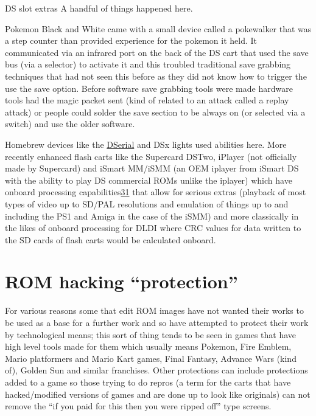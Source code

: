 \documentclass[
]{book}
\begin{document}
DS slot extras A handful of things happened here.

Pokemon Black and White came with a small device called a pokewalker that was a step counter than provided experience for the pokemon it held. It communicated via an infrared port on the back of the DS cart that used the save bus (via a selector) to activate it and this troubled traditional save grabbing techniques that had not seen this before as they did not know how to trigger the use the save option. Before software save grabbing tools were made hardware tools had the magic packet sent (kind of related to an attack called a replay attack) or people could solder the save section to be always on (or selected via a switch) and use the older software.

Homebrew devices like the \href{http://natrium42.com/wiki/DSerial}{DSerial} and DSx lights used abilities here. More recently enhanced flash carts like the Supercard DSTwo, iPlayer (not officially made by Supercard) and iSmart MM/iSMM (an OEM iplayer from iSmart DS with the ability to play DS commercial ROMs unlike the iplayer) which have onboard processing capabilities\href{romhacking202032.html\#fn31x0}{31} that allow for serious extras (playback of most types of video up to SD/PAL resolutions and emulation of things up to and including the PS1 and Amiga in the case of the iSMM) and more classically in the likes of onboard processing for DLDI where CRC values for data written to the SD cards of flash carts would be calculated onboard.

\hypertarget{rom-hacking-protection}{%
\section{ROM hacking ``protection''}\label{rom-hacking-protection}}

For various reasons some that edit ROM images have not wanted their works to be used as a base for a further work and so have attempted to protect their work by technological means; this sort of thing tends to be seen in games that have high level tools made for them which usually means Pokemon, Fire Emblem, Mario platformers and Mario Kart games, Final Fantasy, Advance Wars (kind of), Golden Sun and similar franchises. Other protections can include protections added to a game so those trying to do repros (a term for the carts that have hacked/modified versions of games and are done up to look like originals) can not remove the ``if you paid for this then you were ripped off'' type screens.
\end{document}
